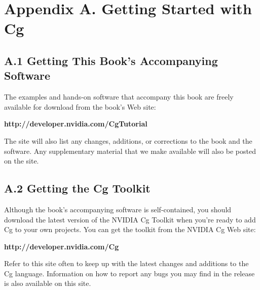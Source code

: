\documentclass[../main.tex]{subfiles}
\begin{document}
\chapter{Appendix A. Getting Started with Cg}

\section{A.1 Getting This Book's Accompanying Software}

The examples and hands-on software that accompany this book are freely available for download from the book's Web site:

\textbf{http://developer.nvidia.com/CgTutorial}

The site will also list any changes, additions, or corrections to the book and the software. Any supplementary material that we make available will also be posted on the site.

\section{A.2 Getting the Cg Toolkit}

Although the book's accompanying software is self-contained, you should download the latest version of the NVIDIA Cg Toolkit when you're ready to add Cg to your own projects. You can get the toolkit from the NVIDIA Cg Web site:

\textbf{http://developer.nvidia.com/Cg}

Refer to this site often to keep up with the latest changes and additions to the Cg language. Information on how to report any bugs you may find in the release is also available on this site.
\end{document}
